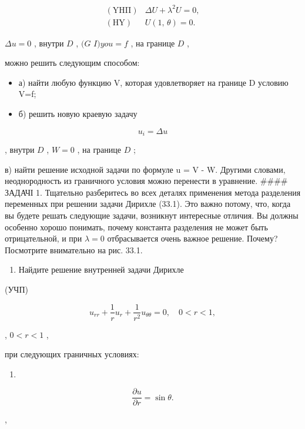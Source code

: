 \documentclass[
  ukrainian,
]{article}
\providecommand{\tightlist}{%
  \setlength{\itemsep}{0pt}\setlength{\parskip}{0pt}}
\begin{document}
\[
\begin{array}{llll} (\mathrm{Y}\mathrm{H}\mathrm{\Pi}) & \Delta U + \lambda^2 U = 0, \\ (\mathrm{H}\mathrm{Y}) & U\left(1,\,\theta\right) = 0. \end{array}
\]

\(\Delta u = 0\) , внутри \(D\) , \((G\) \(I ) you = f\) , на границе
\(D\) ,

можно решить следующим способом:

\begin{itemize}
\tightlist
\item
  а) найти любую функцию V, которая удовлетворяет на границе D условию
  V=f;
\item
  б) решить новую краевую задачу
\end{itemize}

\[
u_i = \Delta u
\]

, внутри \(D\) , \(W = 0\) , на границе \(D\) ;

в) найти решение исходной задачи по формуле u = V - W. Другими словами,
неоднородность из граничного условия можно перенести в уравнение.
\#\#\#\# ЗАДАЧІ 1. Тщательно разберитесь во всех деталях применения
метода разделения переменных при решении задачи Дирихле (33.1). Это
важно потому, что, когда вы будете решать следующие задачи, возникнут
интересные отличия. Вы должны особенно хорошо понимать, почему константа
разделения не может быть отрицательной, и при \(\lambda=0\)
отбрасывается очень важное решение. Почему? Посмотрите внимательно на
рис. 33.1.

\begin{enumerate}
\def\labelenumi{\arabic{enumi}.}
\setcounter{enumi}{1}
\tightlist
\item
  Найдите решение внутренней задачи Дирихле
\end{enumerate}

(УЧП)

\[
u_{rr} + \frac{1}{r}u_r + \frac{1}{r^2}u_{\theta\theta} = 0, \quad 0 < r < 1,
\]

, \(0 < r < 1\) ,

при следующих граничных условиях:

\begin{enumerate}
\def\labelenumi{\alph{enumi})}
\tightlist
\item
\end{enumerate}

\[
\frac{\partial u}{\partial r} = \sin \theta.
\]

,
\end{document}
